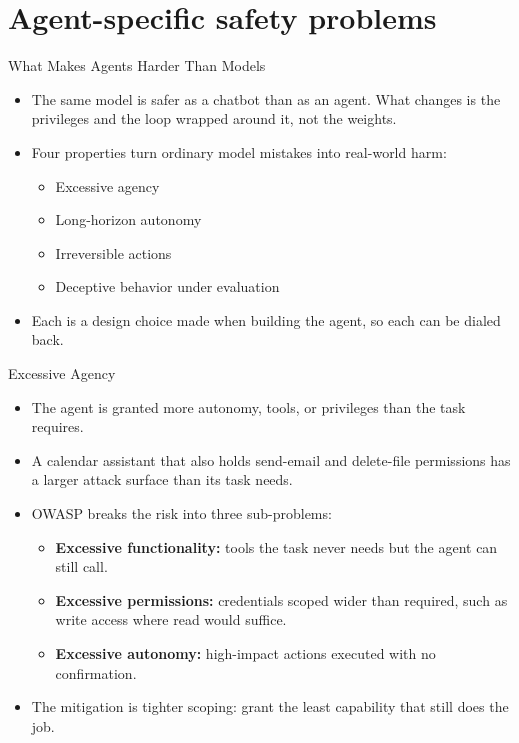\section{Agent-specific safety problems}

\begin{frame}{What Makes Agents Harder Than Models}
  \begin{itemize}\itemsep0.5em
    \item[\textcolor{KAred}{$\blacktriangleright$}] The same model is safer as a chatbot than as an agent. What changes is the privileges and the loop wrapped around it, not the weights.
    \item[\textcolor{KAred}{$\blacktriangleright$}] Four properties turn ordinary model mistakes into real-world harm:
      \begin{itemize}\itemsep0.3em
        \item Excessive agency
        \item Long-horizon autonomy
        \item Irreversible actions
        \item Deceptive behavior under evaluation
      \end{itemize}
    \item[\textcolor{KAred}{$\blacktriangleright$}] Each is a design choice made when building the agent, so each can be dialed back.
  \end{itemize}
\end{frame}

\begin{frame}{Excessive Agency}
  \begin{itemize}\itemsep0.5em
    \item[\textcolor{KAred}{$\blacktriangleright$}] The agent is granted more autonomy, tools, or privileges than the task requires.
    \item[\textcolor{KAred}{$\blacktriangleright$}] A calendar assistant that also holds send-email and delete-file permissions has a larger attack surface than its task needs.
    \item[\textcolor{KAred}{$\blacktriangleright$}] OWASP breaks the risk into three sub-problems:
      \begin{itemize}\itemsep0.3em
        \item \textbf{Excessive functionality:} tools the task never needs but the agent can still call.
        \item \textbf{Excessive permissions:} credentials scoped wider than required, such as write access where read would suffice.
        \item \textbf{Excessive autonomy:} high-impact actions executed with no confirmation.
      \end{itemize}
    \item[\textcolor{KAred}{$\blacktriangleright$}] The mitigation is tighter scoping: grant the least capability that still does the job.
  \end{itemize}
\end{frame}

